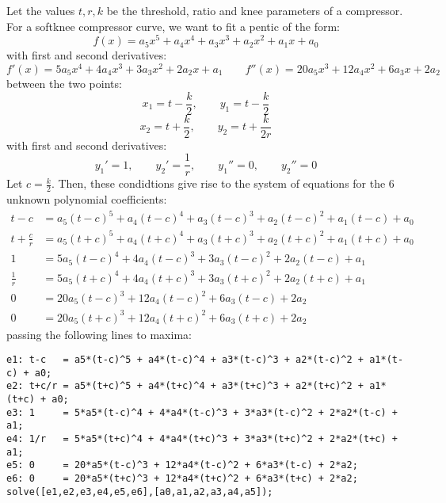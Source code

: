 Let the values $t, r, k$ be the threshold, ratio and knee parameters of a compressor. For a softknee compressor curve, we want to fit a pentic of the form:
\begin{equation}
 f(x) = a_5 x^5 + a_4 x^4 + a_3 x^3 + a_2 x^2 + a_1 x + a_0
\end{equation}
with first and second derivatives:
\begin{equation}
 f'(x) = 5 a_5 x^4 + 4 a_4 x^3 + 3 a_3 x^2 + 2 a_2 x +  a_1
 \qquad
 f''(x) = 20 a_5 x^3 + 12 a_4 x^2 + 6 a_3 x + 2 a_2
\end{equation}
between the two points:
\begin{equation}
 x_1 = t-\frac{k}{2}, \qquad y_1 = t-\frac{k}{2}
\end{equation}
\begin{equation}
 x_2 = t+\frac{k}{2}, \qquad y_2 = t + \frac{k}{2r}
\end{equation}
with first and second derivatives:
\begin{equation}
 y_1' = 1, \qquad y_2' = \frac{1}{r}, \qquad y_1'' = 0, \qquad y_2'' = 0
\end{equation}
Let $c = \frac{k}{2}$. Then, these condidtions give rise to the system of equations for the 6 unknown polynomial coefficients:
\begin{equation}
 \begin{aligned}
 t-c           &= a_5 (t-c)^5 + a_4 (t-c)^4 + a_3 (t-c)^3 + a_2 (t-c)^2 + a_1 (t-c) + a_0  \\
 t+\frac{c}{r} &= a_5 (t+c)^5 + a_4 (t+c)^4 + a_3 (t+c)^3 + a_2 (t+c)^2 + a_1 (t+c) + a_0  \\
 1             &= 5 a_5 (t-c)^4 + 4 a_4 (t-c)^3 + 3 a_3 (t-c)^2 + 2 a_2 (t-c) +  a_1   \\
 \frac{1}{r}   &= 5 a_5 (t+c)^4 + 4 a_4 (t+c)^3 + 3 a_3 (t+c)^2 + 2 a_2 (t+c) +  a_1   \\
 0             &= 20 a_5 (t-c)^3 + 12 a_4 (t-c)^2 + 6 a_3 (t-c) + 2 a_2      \\
 0             &= 20 a_5 (t+c)^3 + 12 a_4 (t+c)^2 + 6 a_3 (t+c) + 2 a_2     
 \end{aligned}
\end{equation}
passing the following lines to maxima:
\begin{verbatim}
e1: t-c   = a5*(t-c)^5 + a4*(t-c)^4 + a3*(t-c)^3 + a2*(t-c)^2 + a1*(t-c) + a0;
e2: t+c/r = a5*(t+c)^5 + a4*(t+c)^4 + a3*(t+c)^3 + a2*(t+c)^2 + a1*(t+c) + a0;
e3: 1     = 5*a5*(t-c)^4 + 4*a4*(t-c)^3 + 3*a3*(t-c)^2 + 2*a2*(t-c) + a1;
e4: 1/r   = 5*a5*(t+c)^4 + 4*a4*(t+c)^3 + 3*a3*(t+c)^2 + 2*a2*(t+c) +  a1;
e5: 0     = 20*a5*(t-c)^3 + 12*a4*(t-c)^2 + 6*a3*(t-c) + 2*a2;
e6: 0     = 20*a5*(t+c)^3 + 12*a4*(t+c)^2 + 6*a3*(t+c) + 2*a2;
solve([e1,e2,e3,e4,e5,e6],[a0,a1,a2,a3,a4,a5]);
\end{verbatim}
